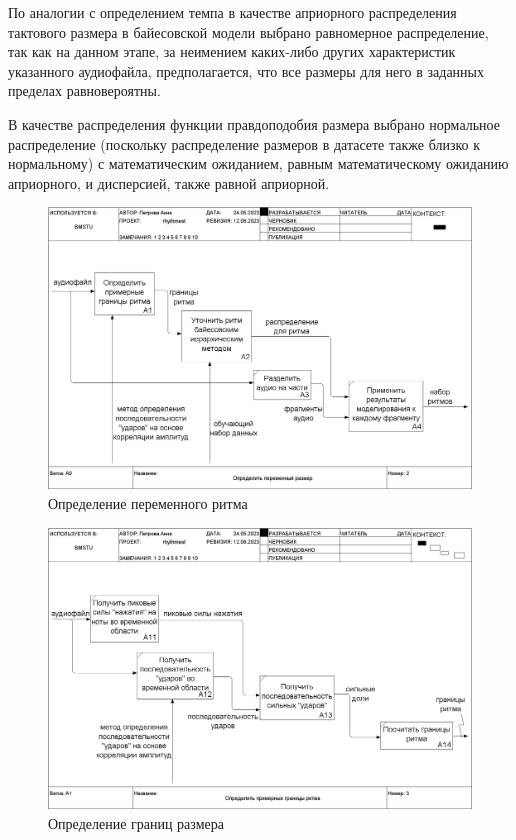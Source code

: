 По аналогии с определением темпа в качестве априорного распределения тактового размера в байесовской модели выбрано равномерное распределение, так как на данном этапе, за неимением каких-либо других характеристик указанного аудиофайла, предполагается, что все размеры для него в заданных пределах равновероятны.

В качестве распределения функции правдоподобия размера выбрано нормальное распределение (поскольку распределение размеров в датасете также близко к нормальному) с математическим ожиданием, равным математическому ожиданию априорного, и дисперсией, также равной априорной.

\begin{figure}[h]
	\centering
	\includegraphics[scale=0.25]{inc/img/rhythm_idef/02_A0.png}
	\caption{Определение переменного ритма}
	\label{img:rhythm_1}
\end{figure}

\begin{figure}[h]
	\centering
	\includegraphics[scale=0.25]{inc/img/rhythm_idef/03_A1.png}
	\caption{Определение границ размера}
	\label{img:rhythm_2}
\end{figure}

